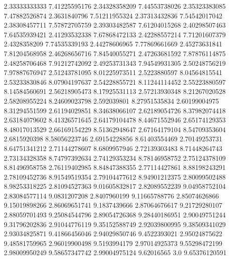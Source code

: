   2.33333333333    7.41225595176
  2.34328358209    7.44553738026
  2.35323383085    7.47882526874
   2.3631840796    7.51211955324
  2.37313432836    7.54542017042
  2.38308457711    7.57872705759
  2.39303482587    7.61204015268
  2.40298507463    7.64535939421
  2.41293532338    7.67868472133
  2.42288557214    7.71201607379
   2.4328358209    7.74535339193
  2.44278606965    7.77869661669
  2.45273631841    7.81204568958
  2.46268656716    7.84540055271
  2.47263681592    7.87876114875
  2.48258706468    7.91212742092
  2.49253731343    7.94549931305
  2.50248756219    7.97887676947
  2.51243781095    8.01225973511
   2.5223880597    8.04564815541
  2.53233830846    8.07904197637
  2.54228855721    8.11244114452
  2.55223880597    8.14584560691
  2.56218905473    8.17925531113
  2.57213930348    8.21267020528
  2.58208955224    8.24609023798
    2.592039801    8.27951535834
  2.60199004975    8.31294551599
  2.61194029851    8.34638066107
  2.62189054726    8.37982074418
  2.63184079602    8.41326571645
  2.64179104478    8.44671552946
  2.65174129353    8.48017013529
  2.66169154229    8.51362948647
  2.67164179104    8.54709353604
   2.6815920398    8.58056223746
  2.69154228856    8.61403554469
  2.70149253731    8.64751341212
  2.71144278607     8.6809957946
  2.72139303483    8.71448264743
  2.73134328358    8.74797392634
  2.74129353234    8.78146958752
  2.75124378109    8.81496958758
  2.76119402985    8.84847388355
  2.77114427861    8.88198243291
  2.78109452736    8.91549519354
  2.79104477612    8.94901212375
  2.80099502488    8.98253318225
  2.81094527363    9.01605832817
  2.82089552239    9.04958752104
  2.83084577114     9.0831207208
   2.8407960199    9.11665788776
  2.85074626866    9.15019898266
  2.86069651741     9.1837439666
  2.87064676617    9.21729280107
  2.88059701493    9.25084544796
  2.89054726368    9.28440186951
  2.90049751244    9.31796202836
  2.91044776119    9.35152588749
  2.92039800995    9.38509341029
  2.93034825871    9.41866456046
  2.94029850746     9.4522393021
  2.95024875622    9.48581759965
  2.96019900498     9.5193994179
  2.97014925373    9.55298472199
  2.98009950249    9.58657347742
  2.99004975124       9.62016565
            3.0    9.65376120591
